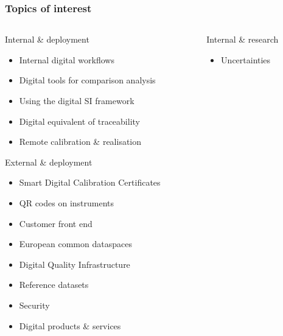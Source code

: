 \documentclass{beamer}
\begin{document}
    \begin{frame}
        \frametitle{Topics of interest}
        \begin{columns}%
            \begin{column}{0.45\textwidth}
                \begin{block}{Internal \& deployment}
                    \scriptsize
                    \begin{itemize}
                        \item Internal digital workflows
                        \item Digital tools for comparison analysis
                        \item Using the digital SI framework
                        \item Digital equivalent of traceability
                        \item Remote calibration \& realisation
                    \end{itemize}
                \end{block}
                \begin{block}{External \& deployment}
                    \scriptsize
                    \begin{itemize}
                        \item Smart Digital Calibration Certificates
                        \item QR codes on instruments
                        \item Customer front end
                        \item European common dataspaces
                        \item Digital Quality Infrastructure
                        \item Reference datasets
                        \item Security
                        \item Digital products \& services
                    \end{itemize}
                \end{block}
            \end{column}
            \begin{column}{0.45\textwidth}
                \begin{block}{Internal \& research}
                    \scriptsize
                    \begin{itemize}
                        \item Uncertainties

\end{itemize}
\end{block}
\end{column}
\end{columns}
\end{frame}
\end{document}
